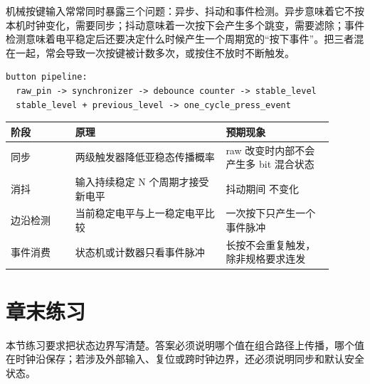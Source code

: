 机械按键输入常常同时暴露三个问题：异步、抖动和事件检测。异步意味着它不按本机时钟变化，需要同步；抖动意味着一次按下会产生多个跳变，需要滤除；事件检测意味着电平稳定后还要决定什么时候产生一个周期宽的“按下事件”。把三者混在一起，常会导致一次按键被计数多次，或按住不放时不断触发。

\begin{lstlisting}
button pipeline:
  raw_pin -> synchronizer -> debounce counter -> stable_level
  stable_level + previous_level -> one_cycle_press_event
\end{lstlisting}

\begin{longtable}{L{0.18\linewidth}L{0.42\linewidth}L{0.3\linewidth}}
\toprule
阶段 & 原理 & 预期现象 \\
\midrule
同步 & 两级触发器降低亚稳态传播概率 & raw 改变时内部不会产生多 bit 混合状态 \\
消抖 & 输入持续稳定 N 个周期才接受新电平 & 抖动期间  不变化 \\
边沿检测 & 当前稳定电平与上一稳定电平比较 & 一次按下只产生一个事件脉冲 \\
事件消费 & 状态机或计数器只看事件脉冲 & 长按不会重复触发，除非规格要求连发 \\
\bottomrule
\end{longtable}

\section*{章末练习}

本节练习要求把状态边界写清楚。答案必须说明哪个值在组合路径上传播，哪个值在时钟沿保存；若涉及外部输入、复位或跨时钟边界，还必须说明同步和默认安全状态。

